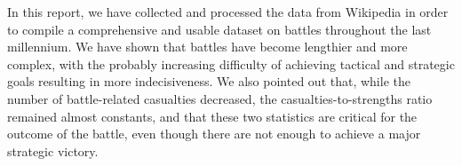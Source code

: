 In this report, we have collected and processed the data from Wikipedia in order to compile a comprehensive and usable dataset on battles throughout the last millennium. We have shown that battles have become lengthier and more complex, with the probably increasing difficulty of achieving tactical and strategic goals resulting in more indecisiveness. We also pointed out that, while the number of battle-related casualties decreased, the casualties-to-strengths ratio remained almost constants, and that these two statistics are critical for the outcome of the battle, even though there are not enough to achieve a major strategic victory.